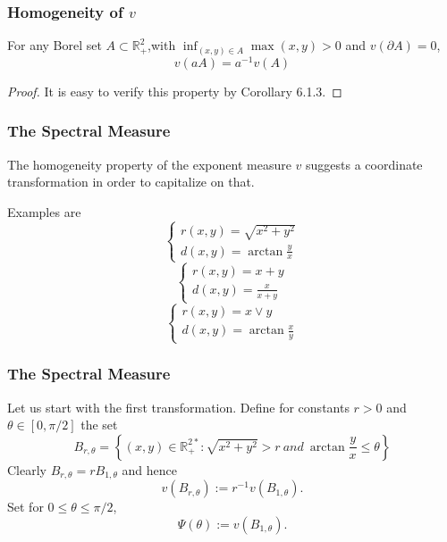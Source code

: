 \documentclass{beamer}
\newcommand{\set}[1]{\left\{#1\right\}}
\begin{document}
\begin{frame}
    \frametitle{Homogeneity of $v$}
For any Borel set $A\subset \mathbb{R}_{+}^2$,with $\inf_{(x,y)\in A}\max(x,y)>0$ and $v(\partial A)=0$,
$$
v(aA)=a^{-1}v(A)
$$

\begin{proof}
    It is easy to verify this property by Corollary 6.1.3.
\end{proof}
\end{frame}


\begin{frame}
    \frametitle{The Spectral Measure}
    The homogeneity property of the exponent measure $v$ suggests a coordinate transformation in order to capitalize on that. 

Examples are
$$
\left\{
\begin{array}{l}
    r(x,y)=\sqrt{x^2+y^2}\\
    d(x,y)=\arctan \frac{y}{x}
\end{array}   
\right.
$$
$$
\left\{
\begin{array}{l}
    r(x,y)=x+y\\
    d(x,y)=\frac{x}{x+y}
\end{array}   
\right.
$$
$$
\left\{
\begin{array}{l}
    r(x,y)=x \lor y\\
    d(x,y)=\arctan \frac{x}{y}
\end{array}   
\right.
$$

\end{frame}


\begin{frame}
    \frametitle{The Spectral Measure}
    Let  us  start  with  the first transformation.  Define  for  constants $r>0$ and $\theta \in [0,\pi/2]$ the set
    $$
B_{r,\theta}=\set{(x,y)\in \mathbb{R}_{+}^{2*}: \sqrt{x^2+y^2}>r \ and \ \arctan \frac{y}{x}\le \theta}
    $$
    Clearly $B_{r,\theta}=rB_{1,\theta}$ and hence 
    $$
v(B_{r,\theta}):=r^{-1} v(B_{1,\theta}).
    $$
Set for $0\le \theta \le \pi/2$,
$$
\Psi(\theta):=v(B_{1,\theta}).
$$
\end{frame}
\end{document}
